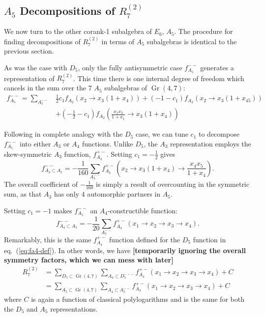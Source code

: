 \documentclass[11pt]{article}
\DeclareMathOperator{\Gr}{Gr}
\def\nl{\nonumber\\}
\def\draftnote#1{{\bf [#1]}}
\def\pdfeq#1{\texorpdfstring{$#1$}{a}}
\begin{document}
\subsection{\pdfeq{A_5} Decompositions of \pdfeq{R^{(2)}_7}}\label{sec:a5-func}

We now turn to the other corank-1 subalgebra of $E_6$, $A_5$. The procedure for finding decompositions of $R^{(2)}_7$ in terms of $A_5$ subalgebras is identical to the previous section. 

As was the case with $D_5$, only the fully antisymmetric case $f_{A_5}^{--}$ generates a representation of $R^{(2)}_7$. This time there is one internal degree of freedom which cancels in the sum over the 7 $A_5$ subalgebras of $\Gr(4,7)$:
\begin{align}
	f_{A_5}^{--} = \sum_{A_5^{--}} 
	& \frac{1}{2} c_1 f_{A_2}\left(x_2\to x_3 \left(1+x_4\right)\right)
	+\left(-1-c_1\right) f_{A_2}\left(x_2\to x_3 \left(1+x_{45}\right)\right)\nl
	&+\left(-\frac{1}{2}-c_1\right) f_{A_2}\left(\frac{x_1 x_2}{1+x_1}\to x_3 \left(1+x_4\right)\right)
\end{align}

Following in complete analogy with the $D_5$ case, we can tune $c_1$ to decompose $f_{A_5}^{--}$ into either $A_3$ or $A_4$ functions. Unlike $D_5$, the $A_3$ representation employs the skew-symmetric $A_3$ function, $f_{A_3}^{+-}$. Setting $c_1 = -\frac{1}{2}$ gives
\begin{equation}
	f_{A_3\subset A_5}^{--} = -\frac{1}{160}\sum_{A_5^{--}} f_{A_3}^{+-}\left(x_2\to x_3(1+x_4)\to \frac{x_4 x_5}{1+x_4}\right).
\end{equation}
The overall coefficient of $-\frac{1}{160}$ is simply a result of overcounting in the symmetric sum, as that $A_3$ has only 4 automorphic partners in $A_5$.

Setting $c_1 = -1$ makes $f_{A_5}^{--}$ an $A_4$-constructible function:
\begin{equation}
	f_{A_4\subset A_5}^{--} = -\frac{1}{20} \sum_{A_5^{--}} f_{A_4}^{+-}(x_1\to x_2 \to x_3 \to x_4).
\end{equation}
Remarkably, this is the same $f_{A_4}^{+-}$ function defined for the $D_5$ function in eq.~(\ref{eq:fa4-def}). In other words, we have \draftnote{temporarily ignoring the overall symmetry factors, which we can mess with later}
\begin{align}
	R^{(2)}_7 &= \sum_{D_5\subset \Gr(4,7)} \sum_{A_4\subset D_5^{---}} f_{A_4}^{+-}(x_1\to x_2 \to x_3 \to x_4) +C \\
	& = \sum_{A_5\subset \Gr(4,7)} \sum_{A_4\subset A_5^{--}} f_{A_4}^{+-}(x_1\to x_2 \to x_3 \to x_4) + C
\end{align}
where $C$ is again a function of classical polylogarithms and is the same for both the $D_5$ and $A_5$ representations. 
\end{document}
